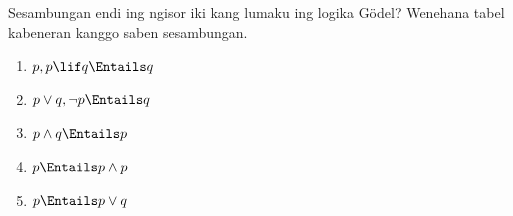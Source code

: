 \documentclass[../../../include/open-logic-section]{subfiles}
\begin{document}
\begin{prob}
  Sesambungan endi ing ngisor iki kang lumaku ing logika G\"odel?
  Wenehana tabel kabeneran kanggo saben sesambungan.
  \begin{enumerate}
    \item $p, p \lif q \Entails q$
    \item $p \lor q, \lnot p \Entails q$
    \item $p \land q \Entails p$
    \item $p \Entails p \land p$
    \item $p \Entails p \lor q$
  \end{enumerate}
\end{prob}
\end{document}
